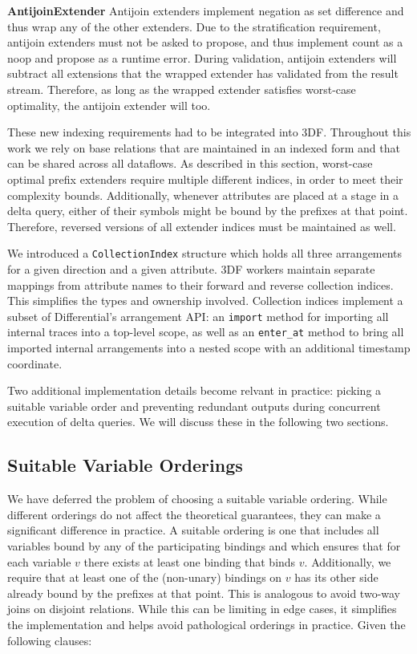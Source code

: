 \documentclass[../index.tex]{subfiles}
\begin{document}
\textbf{AntijoinExtender} Antijoin extenders implement negation as set
difference and thus wrap any of the other extenders. Due to the
stratification requirement, antijoin extenders must not be asked to
propose, and thus implement count as a noop and propose as a runtime
error. During validation, antijoin extenders will subtract all
extensions that the wrapped extender has validated from the result
stream. Therefore, as long as the wrapped extender satisfies
worst-case optimality, the antijoin extender will too.

These new indexing requirements had to be integrated into
3DF. Throughout this work we rely on base relations that are
maintained in an indexed form and that can be shared across all
dataflows. As described in this section, worst-case optimal prefix
extenders require multiple different indices, in order to meet their
complexity bounds. Additionally, whenever attributes are placed at a
stage in a delta query, either of their symbols might be bound by the
prefixes at that point. Therefore, reversed versions of all extender
indices must be maintained as well.

We introduced a \texttt{CollectionIndex} structure which holds all
three arrangements for a given direction and a given attribute. 3DF
workers maintain separate mappings from attribute names to their
forward and reverse collection indices. This simplifies the types and
ownership involved. Collection indices implement a subset of
Differential's arrangement API: an \texttt{import} method for
importing all internal traces into a top-level scope, as well as an
\texttt{enter\_at} method to bring all imported internal arrangements
into a nested scope with an additional timestamp coordinate.

Two additional implementation details become relvant in practice:
picking a suitable variable order and preventing redundant outputs
during concurrent execution of delta queries. We will discuss these in
the following two sections.

\subsection{Suitable Variable Orderings} \label{impl-variable-order}

We have deferred the problem of choosing a suitable variable
ordering. While different orderings do not affect the theoretical
guarantees, they can make a significant difference in practice. A
suitable ordering is one that includes all variables bound by any of
the participating bindings and which ensures that for each variable
$v$ there exists at least one binding that binds $v$. Additionally, we
require that at least one of the (non-unary) bindings on $v$ has its
other side already bound by the prefixes at that point. This is
analogous to avoid two-way joins on disjoint relations. While this can
be limiting in edge cases, it simplifies the implementation and helps
avoid pathological orderings in practice. Given the following clauses:
\end{document}
